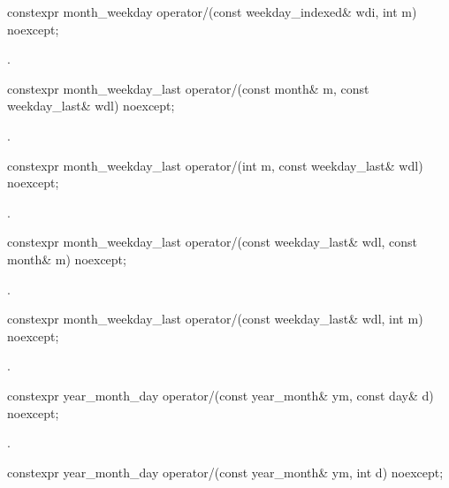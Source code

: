 \begin{itemdecl}
constexpr month_weekday
  operator/(const weekday_indexed& wdi, int m) noexcept;
\end{itemdecl}

\begin{itemdescr}
\pnum
\returns
{}.
\end{itemdescr}

\begin{itemdecl}
constexpr month_weekday_last
  operator/(const month& m, const weekday_last& wdl) noexcept;
\end{itemdecl}

\begin{itemdescr}
\pnum
\returns
{}.
\end{itemdescr}

\begin{itemdecl}
constexpr month_weekday_last
  operator/(int m, const weekday_last& wdl) noexcept;
\end{itemdecl}

\begin{itemdescr}
\pnum
\returns
{}.
\end{itemdescr}

\begin{itemdecl}
constexpr month_weekday_last
  operator/(const weekday_last& wdl, const month& m) noexcept;
\end{itemdecl}

\begin{itemdescr}
\pnum
\returns
{}.
\end{itemdescr}

\begin{itemdecl}
constexpr month_weekday_last
  operator/(const weekday_last& wdl, int m) noexcept;
\end{itemdecl}

\begin{itemdescr}
\pnum
\returns
{}.
\end{itemdescr}

\begin{itemdecl}
constexpr year_month_day
  operator/(const year_month& ym, const day& d) noexcept;
\end{itemdecl}

\begin{itemdescr}
\pnum
\returns
{}.
\end{itemdescr}

\begin{itemdecl}
constexpr year_month_day
  operator/(const year_month& ym, int d) noexcept;
\end{itemdecl}

